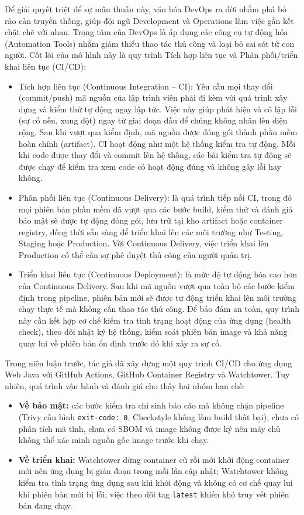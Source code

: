 \documentclass[12pt,a4paper,oneside]{extreport}
\begin{document}
Để giải quyết triệt để sự mâu thuẫn này, văn hóa DevOps ra đời nhằm phá bỏ rào
cản truyền thống, giúp đội ngũ Development và Operations làm việc gắn kết chặt
chẽ với nhau. Trọng tâm của DevOps là áp dụng các công cụ tự động hóa
(Automation Tools) nhằm giảm thiểu thao tác thủ công và loại bỏ sai sót từ con
người. Cốt lõi của mô hình này là quy trình Tích hợp liên tục và Phân
phối/triển khai liên tục (CI/CD):
\begin{itemize}
  \item Tích hợp liên tục (Continuous Integration -- CI): Yêu cầu mọi thay đổi
  (commit/push) mã nguồn của lập trình viên phải đi kèm với quá trình xây dựng
  và kiểm thử tự động ngay lập tức. Việc này giúp phát hiện và cô lập lỗi (sự
  cố nền, xung đột) ngay từ giai đoạn đầu để chúng không nhân lên diện rộng. Sau
  khi vượt qua kiểm định, mã nguồn được đóng gói thành phần mềm hoàn chỉnh
  (artifact). CI hoạt động như một hệ thống kiểm tra tự động. Mỗi khi code được
  thay đổi và commit lên hệ thống, các bài kiểm tra tự động sẽ được chạy để
  kiểm tra xem code có hoạt động đúng và không gây lỗi hay không.
  \item Phân phối liên tục (Continuous Delivery): là quá trình tiếp nối CI,
  trong đó mọi phiên bản phần mềm đã vượt qua các bước build, kiểm thử và đánh
  giá bảo mật sẽ được tự động đóng gói, lưu trữ tại kho artifact hoặc container
  registry, đồng thời sẵn sàng để triển khai lên các môi trường như Testing,
  Staging hoặc Production. Với Continuous Delivery, việc triển khai lên
  Production có thể cần sự phê duyệt thủ công của người quản trị.
  \item Triển khai liên tục (Continuous Deployment): là mức độ tự động hóa cao
  hơn của Continuous Delivery. Sau khi mã nguồn vượt qua toàn bộ các bước kiểm
  định trong pipeline, phiên bản mới sẽ được tự động triển khai lên môi trường
  chạy thực tế mà không cần thao tác thủ công. Để bảo đảm an toàn, quy trình
  này cần kết hợp cơ chế kiểm tra tình trạng hoạt động của ứng dụng (health
  check), theo dõi nhật ký hệ thống, kiểm soát phiên bản image và khả năng quay
  lui về phiên bản ổn định trước đó khi xảy ra sự cố.
\end{itemize}


Trong niên luận trước, tác giả đã xây dựng một quy trình CI/CD cho ứng dụng Web
Java với GitHub Actions, GitHub Container Registry và Watchtower. Tuy nhiên, quá
trình vận hành và đánh giá cho thấy hai nhóm hạn chế:
\begin{itemize}
  \item \textbf{Về bảo mật:} các bước kiểm tra chỉ sinh báo cáo mà không chặn
  pipeline (Trivy cấu hình \texttt{exit-code: 0}, Checkstyle không làm build
  thất bại), chưa có phân tích mã tĩnh, chưa có SBOM và image không được ký nên
  máy chủ không thể xác minh nguồn gốc image trước khi chạy.
  \item \textbf{Về triển khai:} Watchtower dừng container cũ rồi mới khởi động
  container mới nên ứng dụng bị gián đoạn trong mỗi lần cập nhật; Watchtower
  không kiểm tra tình trạng ứng dụng sau khi khởi động và không có cơ chế quay
  lui khi phiên bản mới bị lỗi; việc theo dõi tag \texttt{latest} khiến khó
  truy vết phiên bản đang chạy.
\end{itemize}
\end{document}

